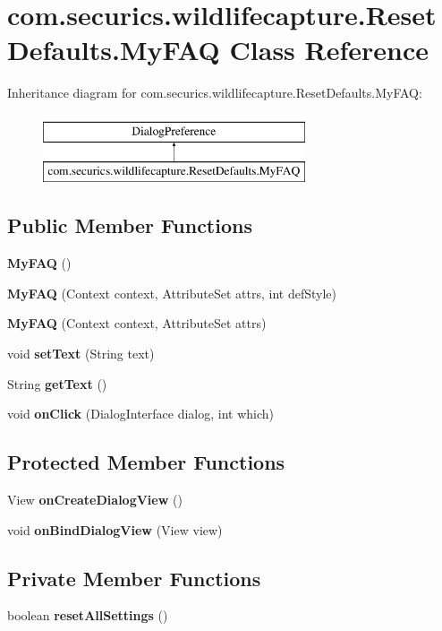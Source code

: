 \section{com.\+securics.\+wildlifecapture.\+Reset\+Defaults.\+My\+F\+A\+Q Class Reference}
\label{classcom_1_1securics_1_1wildlifecapture_1_1_reset_defaults_1_1_my_f_a_q}
Inheritance diagram for com.\+securics.\+wildlifecapture.\+Reset\+Defaults.\+My\+F\+A\+Q\+:\begin{figure}[H]
\begin{center}
\leavevmode
\includegraphics[height=2.000000cm]{classcom_1_1securics_1_1wildlifecapture_1_1_reset_defaults_1_1_my_f_a_q}
\end{center}
\end{figure}
\subsection*{Public Member Functions}
\begin{DoxyCompactItemize}
\item 
{\bf My\+F\+A\+Q} ()
\item 
{\bf My\+F\+A\+Q} (Context context, Attribute\+Set attrs, int def\+Style)
\item 
{\bf My\+F\+A\+Q} (Context context, Attribute\+Set attrs)
\item 
void {\bf set\+Text} (String text)
\item 
String {\bf get\+Text} ()
\item 
void {\bf on\+Click} (Dialog\+Interface dialog, int which)
\end{DoxyCompactItemize}
\subsection*{Protected Member Functions}
\begin{DoxyCompactItemize}
\item 
View {\bf on\+Create\+Dialog\+View} ()
\item 
void {\bf on\+Bind\+Dialog\+View} (View view)
\end{DoxyCompactItemize}
\subsection*{Private Member Functions}
\begin{DoxyCompactItemize}
\item 
boolean {\bf reset\+All\+Settings} ()
\end{DoxyCompactItemize}
